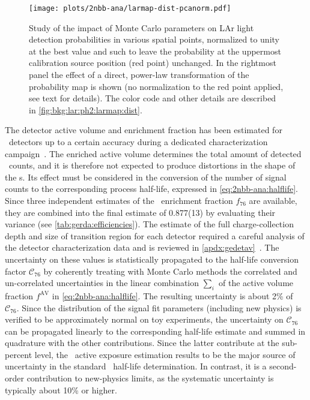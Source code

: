 \begin{description}[wide]
    \begin{figure}
      \centering
      \texttt{[image: plots/2nbb-ana/larmap-dist-pcanorm.pdf]}
      \caption{%
        Study of the impact of Monte Carlo parameters on LAr light detection probabilities in
        various spatial points, normalized to unity at the best value and such to leave the
        probability at the uppermost calibration source position (red point) unchanged. In
        the rightmost panel the effect of a direct, power-law transformation of the
        probability map is shown (no normalization to the red point applied, see text for
        details). The color code and other details are described in
        \cref{fig:bkg:lar:ph2:larmap:dist}.
      }\label{fig:2nbb-ana:dist-pcanorm}
    \end{figure}

  \item[\gesix\ active exposure] The detector active volume and enrichment fraction has
    been estimated for \bege\ detectors up to a certain accuracy during a dedicated
    characterization campaign~\cite{Agostini2015e, Agostini2019}. The enriched active
    volume determines the total amount of detected \nnbb\ counts, and it is therefore not
    expected to produce distortions in the shape of the \pdf{}s. Its effect must be
    considered in the conversion of the number of signal counts to the corresponding
    process half-life, expressed in \cref{eq:2nbb-ana:halflife}.  Since three independent
    estimates of the \bege\ enrichment fraction $f_{76}$ are
    available\cite{Agostini2015e},
    they are combined into the final estimate of 0.877(13) by evaluating their variance
    (see \cref{tab:gerda:efficiencies}). The estimate of the full charge-collection depth
    and size of transition region for each detector required a careful analysis of the
    detector characterization data and is reviewed in
    \cref{apdx:gedetav}~\cite{Agostini2019, Lehnert2016}. The uncertainty on these values
    is statistically propagated to the half-life conversion factor $\mathcal{C}_{76}$ by
    coherently treating with Monte Carlo methods the correlated and un-correlated
    uncertainties in the linear combination $\sum_i$ of the active volume fraction
    $f^\text{AV}$ in \cref{eq:2nbb-ana:halflife}. The resulting uncertainty is about 2\%
    of $\mathcal{C}_{76}$. Since the distribution of the signal fit parameters (including
    new physics) is verified to be approximately normal on toy experiments, the
    uncertainty on $\mathcal{C}_{76}$ can be propagated linearly to the corresponding half-life
    estimate and summed in quadrature with the other contributions. Since the latter
    contribute at the sub-percent level, the \gesix\ active exposure estimation results to
    be the major source of uncertainty in the standard \nnbb\ half-life determination. In
    contrast, it is a second-order contribution to new-physics limits, as the systematic
    uncertainty is typically about 10\% or higher.


\end{description}
